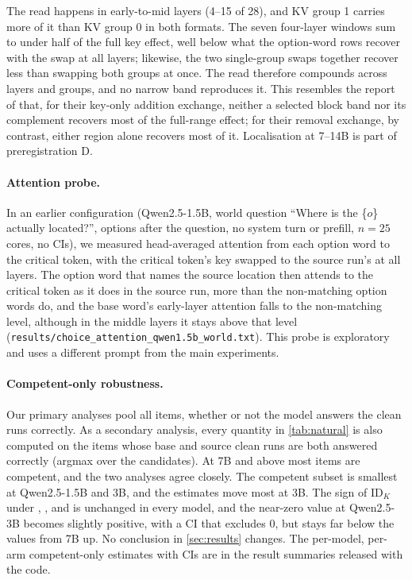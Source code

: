 The read happens in early-to-mid layers (4--15 of 28), and KV group 1 carries more of it than KV group 0 in both formats. The seven four-layer windows sum to under half of the full key effect, well below what the option-word rows recover with the swap at all layers; likewise, the two single-group swaps together recover less than swapping both groups at once. The read therefore compounds across layers and groups, and no narrow band reproduces it. This resembles the report of \citet{anonymous2026fitted} that, for their key-only addition exchange, neither a selected block band nor its complement recovers most of the full-range effect; for their removal exchange, by contrast, either region alone recovers most of it. Localisation at 7--14B is part of preregistration D. 

\paragraph{Attention probe.} In an earlier configuration (Qwen2.5-1.5B, world question ``Where is the \{$o$\} actually located?'', options after the question, no system turn or prefill, $n = 25$ cores, no CIs), we measured head-averaged attention from each option word to the critical token, with the critical token's key swapped to the source run's at all layers. The option word that names the source location then attends to the critical token as it does in the source run, more than the non-matching option words do, and the base word's early-layer attention falls to the non-matching level, although in the middle layers it stays above that level (\texttt{results/choice\_attention\_qwen1.5b\_world.txt}). This probe is exploratory and uses a different prompt from the main experiments.

\paragraph{Competent-only robustness.} Our primary analyses pool all items, whether or not the model answers the clean runs correctly. As a secondary analysis, every quantity in \cref{tab:natural} is also computed on the items whose base and source clean runs are both answered correctly (argmax over the candidates). At 7B and above most items are competent, and the two analyses agree closely. The competent subset is smallest at Qwen2.5-1.5B and 3B, and the estimates move most at 3B. The sign of $\mathrm{ID}_K$ under \fmtOpt{}, \fmtLetter{}, \fmtNone{} and \fmtBefore{} is unchanged in every model, and the near-zero \fmtPost{} value at Qwen2.5-3B becomes slightly positive, with a CI that excludes 0, but stays far below the \fmtPost{} values from 7B up. No conclusion in \cref{sec:results} changes. The per-model, per-arm competent-only estimates with CIs are in the result summaries released with the code.
